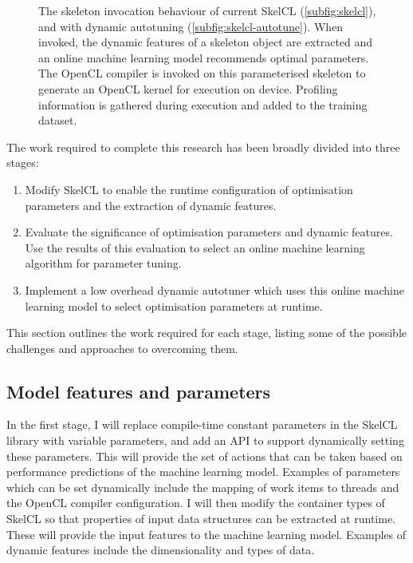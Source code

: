 \begin{figure*}[t!]
\centering

\caption{The skeleton invocation behaviour of current SkelCL
  (\ref{subfig:skelcl}), and with dynamic autotuning
  (\ref{subfig:skelcl-autotune}). When invoked, the dynamic features
  of a skeleton object are extracted and an online machine learning
  model recommends optimal parameters. The OpenCL compiler is invoked
  on this parameterised skeleton to generate an OpenCL kernel for
  execution on device. Profiling information is gathered during
  execution and added to the training dataset.}
\label{fig:method}
\end{figure*}

The work required to complete this research has been broadly divided
into three stages:

\begin{enumerate}
\item Modify SkelCL to enable the runtime configuration of
  optimisation parameters and the extraction of dynamic features.
\item Evaluate the significance of optimisation parameters and dynamic
  features. Use the results of this evaluation to select an online
  machine learning algorithm for parameter tuning.
\item Implement a low overhead dynamic autotuner which uses this
  online machine learning model to select optimisation parameters at
  runtime.
\end{enumerate}

This section outlines the work required for each stage, listing some
of the possible challenges and approaches to overcoming them.

\subsection{Model features and parameters}
In the first stage, I will replace compile-time constant parameters in
the SkelCL library with variable parameters, and add an API to support
dynamically setting these parameters. This will provide the set of
actions that can be taken based on performance predictions of the
machine learning model. Examples of parameters which can be set
dynamically include the mapping of work items to threads and the
OpenCL compiler configuration. I will then modify the container types
of SkelCL so that properties of input data structures can be extracted
at runtime. These will provide the input features to the machine
learning model. Examples of dynamic features include the
dimensionality and types of data.

